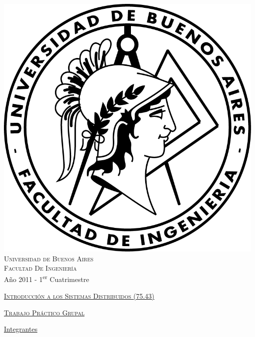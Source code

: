 \documentclass[12pt,titlepage]{article}
\begin{document}
\begin{titlepage}

\thispagestyle{empty}

\begin{center}
\includegraphics[scale=0.55]{./logo_caratula}\\
\large{\textsc{Universidad de Buenos Aires}}\\
\large{\textsc{Facultad De Ingeniería}}\\
\small{Año 2011 - 1\textsuperscript{er} Cuatrimestre}
\end{center}

\vfill

\begin{center}

\Large{\underline{\textsc{Introducción a los Sistemas Distribuidos (75.43)}}}

\vfill


\Large{\underline{\textsc{Trabajo Práctico Grupal}}}

\vfill

\Large\underline{Integrantes} \linebreak\linebreak


\end{center}
\end{titlepage}
\end{document}
